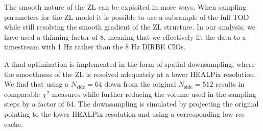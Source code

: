 \documentclass[twocolumn]{aa}
\begin{document}
The smooth nature of the ZL can be exploited in more ways. When sampling parameters for the ZL model it is possible to use a subsample of the full TOD while still resolving the smooth gradient of the ZL structure. In our analysis, we have used a thinning factor of 8, meaning that we effectively fit the data to a timestream with 1 Hz rather than the 8 Hz DIRBE CIOs. 

A final optimization is implemented in the form of spatial downsampling, where the smoothness of the ZL is resolved adequately at a lower HEALPix resolution. We find that using a $N_\mathrm{side} = 64$ down from the original $N_\mathrm{side} = 512$ results in comparable $\chi^2$ measures while further reducing the volume used in the sampling steps by a factor of 64. The downsampling is simulated by projecting the original pointing to the lower HEALPix resolution and using a corresponding low-res cache.
\end{document}
